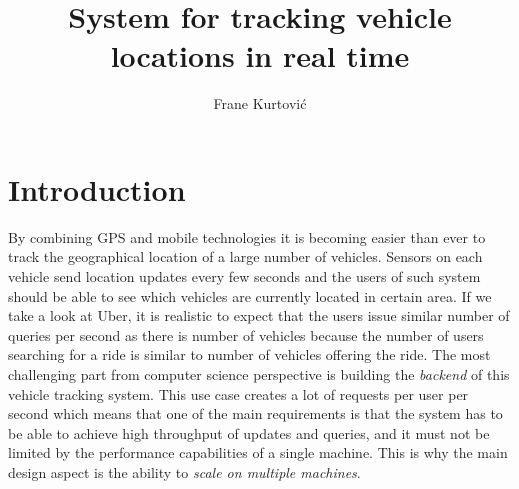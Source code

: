 \documentclass[times, utf8, diplomski]{fer}
\begin{document}

\title{System for tracking vehicle locations in real time}

\author{Frane Kurtović}

\maketitle

\izvornik


\tableofcontents















\chapter{Introduction}
By combining GPS and mobile technologies it is becoming easier than ever to track the geographical location of a large number of vehicles. Sensors on each vehicle send location updates every few seconds and the users of such system should be able to see which vehicles are currently located in certain area. If we take a look at Uber, it is realistic to expect that the users issue similar number of queries per second as there is number of vehicles because the number of users searching for a ride is similar to number of vehicles offering the ride. The most challenging part from computer science perspective is building the \emph{backend} of this vehicle tracking system. This use case creates a lot of requests per user per second which means that one of the main requirements is that the system has to be able to achieve high throughput of updates and queries, and it must not be limited by the performance capabilities of a single machine. This is why the main design aspect is the ability to \emph{scale on multiple machines}.
\end{document}
